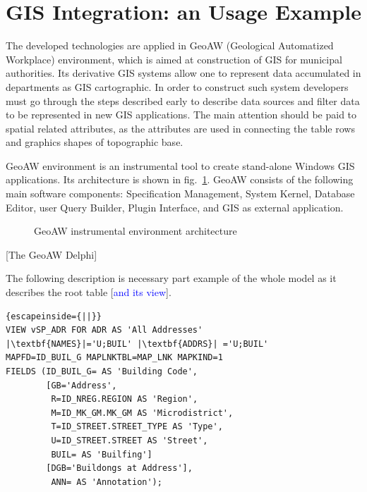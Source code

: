 \documentclass[conference]{IEEEtran}
\newcommand{\e}[2][fcolor]{\textcolor{pcolor}{[}\textcolor{#1}{#2}\textcolor{pcolor}{]}}
\begin{document}
\section{GIS Integration: an Usage Example}
\label{sec:gis-integration}

The developed technologies are applied in GeoAW (Geological Automatized Workplace) environment, which is aimed at construction of GIS for municipal authorities.  Its derivative GIS systems allow one to represent data accumulated in departments as GIS cartographic.  In order to construct such system developers must go through the steps described early to describe data sources and filter data to be represented in new GIS applications.  The main attention should be paid to spatial related attributes, as the attributes are used in connecting the table rows and graphics shapes of topographic base.

GeoAW environment is an instrumental tool to create stand-alone Windows GIS applications.  Its architecture is shown in fig.~\ref{fig:architecture}.  GeoAW consists of the following main software components: Specification Management,  System Kernel, Database Editor, user Query Builder, Plugin Interface, and GIS as external application.
\begin{figure}[bt]
  \centering
  \def\svgwidth{\linewidth}
  \tiny\sffamily
  \def\db{Database}
  \def\spec{Specification}
  \def\sce{\vtop{Specification\break Management}}
  \def\kerne{Kernel}
  \def\bde{\vtop{Database\break Editor}}
  \def\qb{\vtop{Query\break Builder}}
  \def\map{GIS}
  \def\gb{Graphic Base}
  \def\plug{Plugins}
  \def\intfs{\vtop{Plugin\break Interface}}
  
  \caption{GeoAW instrumental environment architecture}
  \label{fig:architecture}
\end{figure}

\e{The GeoAW Delphi}

The following description is necessary part example of the whole model as it describes the root table \e[blue]{and its view}.

\begin{lstlisting}{escapeinside={||}}
VIEW vSP_ADR FOR ADR AS 'All Addresses'
|\textbf{NAMES}|='U;BUIL' |\textbf{ADDRS}| ='U;BUIL'
MAPFD=ID_BUIL_G MAPLNKTBL=MAP_LNK MAPKIND=1
FIELDS (ID_BUIL_G= AS 'Building Code',
        [GB='Address',
         R=ID_NREG.REGION AS 'Region',
         M=ID_MK_GM.MK_GM AS 'Microdistrict',
         T=ID_STREET.STREET_TYPE AS 'Type',
         U=ID_STREET.STREET AS 'Street',
         BUIL= AS 'Builfing']
        [DGB='Buildongs at Address'],
         ANN= AS 'Annotation');
\end{lstlisting}
\end{document}
